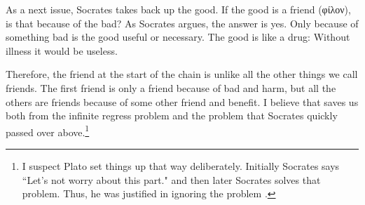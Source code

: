 \documentclass[11pt]{article}
\begin{document}
As a next issue, Socrates takes back up the good.  If the good is a friend (φίλον), is that because of the bad?  As Socrates argues, the answer is yes.  Only because of something bad is the good useful or necessary.  The good is like a drug: Without illness it would be useless.

Therefore, the friend at the start of the chain is unlike all the other things we call friends.  The first friend is only a friend because of bad and harm, but all the others are friends because of some other friend and benefit.  I believe that saves us both from the infinite regress problem and the problem that Socrates quickly passed over above.\footnote{I suspect Plato set things up that way deliberately.  Initially Socrates says ``Let's not worry about this part." and then later Socrates solves that problem.  Thus, he was justified in ignoring the problem .}

\newpage


\end{document}
